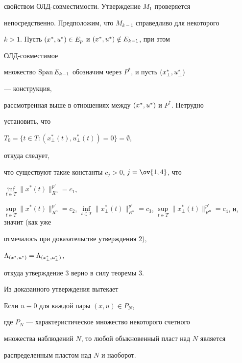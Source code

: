\begin{pf}
свойством ОЛД-совместимости. Утверждение $M_1$ проверяется 


непосредственно. Предположим, что $M_{k-1}$ справедливо для некоторого 


$k>1$. Пусть ${(x^*_{},u^*_{})}\in E_p$ и ${(x^*_{},u^*_{})}\notin E_{k-1}$, при этом 


ОЛД-совместимое 


множество $\operatorname{Span} E_{k-1}$ обозначим через $P^*$, и пусть ${(x^*_{\bot},u^*_{\bot})}$ 


--- конструкция, 


рассмотренная выше в отношениях между ${(x^*_{},u^*_{})}$ и $P^*$. Нетрудно 


установить, что 


$T_0=\{t\in T:(x^*_\bot(t),u^*_\bot(t))=0\}=\emptyset$, 


откуда следует, 


что существуют такие константы $c_j>0$, $j=\ov{1,4}$, что 


$\inf\limits_{t\in T}\|x^*(t)\|^{p'}_{R^n}=c_1$, 


$\sup\limits_{t\in T}\|x^*(t)\|^{p'}_{R^n}=c_2$, $\inf\limits_{t\in 


T}\|x^*_\bot(t)\|^{p'}_{R^n}=c_3$, $\sup\limits_{t\in 


T}\|x^*_\bot(t)\|^{p'}_{R^n}=c_4$, и, значит (как уже 


отмечалось при доказательстве утверждения 2),


$\Lambda_{{(x^*_{},u^*_{})}}=\Lambda_{{(x^*_{\bot},u^*_{\bot})}}$, 


откуда утверждение 3 верно в силу теоремы 3. 


\end{pf} 


 


Из доказанного утверждения вытекает 


 


\begin{assrt} 


Если $u\equiv0$ для каждой пары $(x,u)\in P_N$, 


где $P_N$ --- характеристическое множество некоторого счетного 


множества наблюдений $N$, то любой обыкновенный пласт над $N$ является 


распределенным пластом над $N$ и наоборот. 


\end{assrt} 





